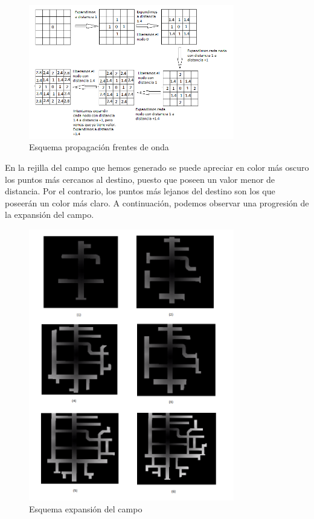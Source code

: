 \begin{figure}[H]
  \begin{center}
    \includegraphics[width=0.8\textwidth]{figures/GPP/algoritmo_expansion.png}
		\caption{Esquema propagación frentes de onda}
		\label{fig.algoritmo_expansion_gpp}
		\end{center}
\end{figure}


En la rejilla del campo que hemos generado se puede apreciar en color más oscuro los puntos más cercanos al destino, puesto que poseen un valor menor de distancia. Por el contrario, los puntos más lejanos del destino son los que poseerán un color más claro. A continuación, podemos observar una progresión de la expansión del campo.\\

\begin{figure}[H]
  \begin{center}
    \includegraphics[width=0.8\textwidth]{figures/GPP/expansiones.png}
		\caption{Esquema expansión del campo}
		\label{fig.expansiones_gpp}
		\end{center}
\end{figure}

